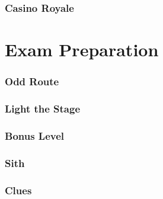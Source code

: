 \documentclass[10pt,a4paper,twoside]{report}
\begin{document}
\newpage
\subsection*{Casino Royale}
\begin{keywords}\end{keywords}



\chapter{Exam Preparation}

\subsection*{Odd Route}
\begin{keywords}\end{keywords}


\newpage
\subsection*{Light the Stage}
\begin{keywords}\end{keywords}


\newpage
\subsection*{Bonus Level}
\begin{keywords}\end{keywords}


\newpage
\subsection*{Sith}
\begin{keywords}\end{keywords}



\newpage
\subsection*{Clues}
\begin{keywords}\end{keywords}

\end{document}
